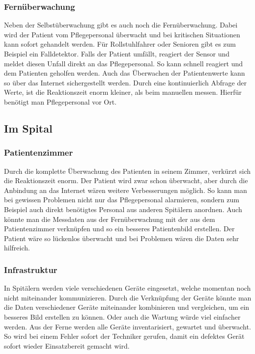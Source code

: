 \subsubsection{Fernüberwachung}
Neben der Selbstüberwachung gibt es auch noch die Fernüberwachung. Dabei wird der Patient vom Pflegepersonal überwacht und bei kritischen Situationen kann sofort gehandelt werden. Für Rollstuhlfahrer oder Senioren gibt es zum Beispiel ein Falldetektor. Falls der Patient umfällt, reagiert der Sensor und meldet diesen Unfall direkt an das Pflegepersonal. So kann schnell reagiert und dem Patienten geholfen werden. Auch das Überwachen der Patientenwerte kann so über das Internet sichergestellt werden. Durch eine kontinuierlich Abfrage der Werte, ist die Reaktionszeit enorm kleiner, als beim manuellen messen. Hierfür benötigt man Pflegepersonal vor Ort.
\subsection{Im Spital}
\subsubsection{Patientenzimmer}
Durch die komplette Überwachung des Patienten in seinem Zimmer, verkürzt sich die Reaktionszeit enorm. Der Patient wird zwar schon überwacht, aber durch die Anbindung an das Internet wären weitere Verbesserungen möglich. So kann man bei gewissen Problemen nicht nur das Pflegepersonal alarmieren, sondern zum Beispiel auch direkt benötigtes Personal aus anderen Spitälern anordnen. Auch könnte man die Messdaten aus der Fernüberwachung mit der aus dem Patientenzimmer verknüpfen und so ein besseres Patientenbild erstellen. Der Patient wäre so lückenlos überwacht und bei Problemen wären die Daten sehr hilfreich.
\subsubsection{Infrastruktur}
In Spitälern werden viele verschiedenen Geräte eingesetzt, welche momentan noch nicht miteinander kommunizieren. Durch die Verknüpfung der Geräte könnte man die Daten verschiedener Geräte miteinander kombinieren und vergleichen, um ein besseres Bild erstellen zu können. Oder auch die Wartung würde viel einfacher werden. Aus der Ferne werden alle Geräte inventarisiert, gewartet und überwacht. So wird bei einem Fehler sofort der Techniker gerufen, damit ein defektes Gerät sofort wieder Einsatzbereit gemacht wird.
 
\newpage

